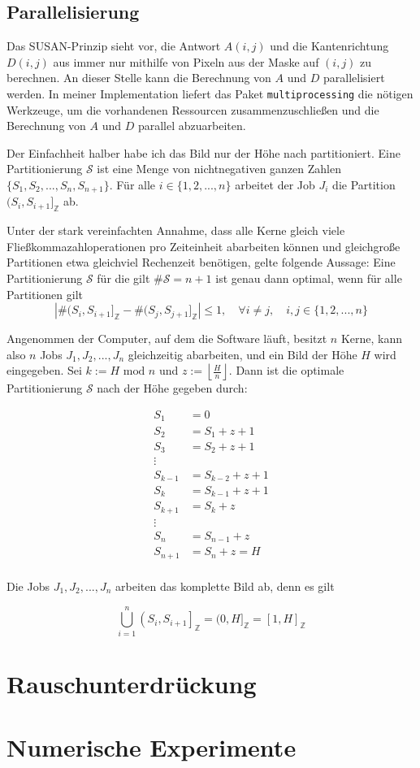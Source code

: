 \documentclass[a4paper, 11pt]{report}
\theoremstyle{definition}
\begin{document}
		\subsection{Parallelisierung}
			Das SUSAN-Prinzip sieht vor, die Antwort $A(i,j)$ und die Kantenrichtung $D(i,j)$ aus  immer nur mithilfe von Pixeln aus der Maske auf $(i,j)$ zu berechnen. An dieser Stelle kann die Berechnung von $A$ und $D$ parallelisiert werden. In meiner Implementation liefert das Paket \texttt{multiprocessing} die nötigen Werkzeuge, um die vorhandenen Ressourcen zusammenzuschließen und die Berechnung von $A$ und $D$ parallel abzuarbeiten.

			Der Einfachheit halber habe ich das Bild nur der Höhe nach partitioniert. Eine Partitionierung $\mathcal{S}$ ist eine Menge von nichtnegativen ganzen Zahlen $\{S_1, S_2, ..., S_n, S_{n+1}\}$. Für alle $i \in \{1,2,...,n\}$ arbeitet der Job $J_i$ die Partition $(S_i, S_{i+1}]_\mathbb{Z}$ ab.

			Unter der stark vereinfachten Annahme, dass alle Kerne gleich viele Fließkommazahloperationen pro Zeiteinheit abarbeiten können und gleichgroße Partitionen etwa gleichviel Rechenzeit benötigen, gelte folgende Aussage: Eine Partitionierung $\mathcal{S}$ für die gilt $\#\mathcal{S} = n+1$ ist genau dann optimal, wenn für alle Partitionen gilt
			$$|\#(S_i, S_{i+1}]_\mathbb{Z} - \#(S_j, S_{j+1}]_\mathbb{Z}| \leq 1, \quad \forall i \neq j, \quad i,j \in \{1,2,...,n\}$$

			Angenommen der Computer, auf dem die Software läuft, besitzt $n$ Kerne, kann also $n$ Jobs $J_1,J_2,...,J_n$ gleichzeitig abarbeiten, und ein Bild der Höhe $H$ wird eingegeben. Sei $k := H \text{ mod } n$ und $z := \left\lfloor \frac{H}{n} \right\rfloor$. Dann ist die optimale Partitionierung $\mathcal{S}$ nach der Höhe gegeben durch:

			\begin{align*}
			S_1 	&= 					0		\\
			S_2 	&= S_1		+	z + 1		\\
			S_3 	&= S_2 		+ 	z + 1		\\
								\vdots			\\
			S_{k-1} &= S_{k-2}	+ 	z + 1		\\
			S_{k}	&= S_{k-1} 	+ 	z + 1		\\
			S_{k+1} &= S_k 		+ 	z			\\
								\vdots			\\
			S_{n} 	&= S_{n-1} 	+ 	z 			\\
			S_{n+1} &= S_{n}	+	z  = H	\\
			\end{align*}

			Die Jobs $J_1, J_2, ..., J_n$ arbeiten das komplette Bild ab, denn es gilt

			$$ \bigcup_{i=1}^n \left(S_i, S_{i+1}\right]_\mathbb{Z} = (0,H]_\mathbb{Z} = [1,H]_\mathbb{Z}$$

		\section{Rauschunterdrückung}


		\section{Numerische Experimente}
\end{document}
